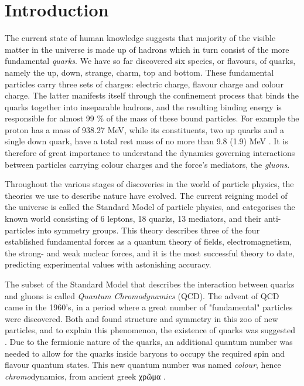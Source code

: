 \chapter{Introduction}

The current state of human knowledge suggests that majority of the visible
matter in the universe is made up of hadrons which in turn consist of
the more fundamental \emph{quarks}. We have so far discovered six species, or
flavours, of quarks, namely the up, down, strange, charm, top and bottom. These
fundamental particles carry three sets of charges: electric charge, flavour
charge and colour charge. The latter manifests itself
through the confinement process that binds the quarks together into inseparable
hadrons, and the resulting binding energy is responsible for almost 99 \% of the
mass of these bound particles. For example the proton has a mass of 938.27 MeV,
while its constituents, two up quarks and a single down quark, have a total rest
mass of no more than 9.8 (1.9) MeV \citep{Agashe:2014kda}. It is therefore of
great importance to understand the dynamics governing interactions between
particles carrying colour charges and the force's mediators, the \emph{gluons}. 

Throughout the various stages of discoveries in the world of particle physics,
the theories we use to describe nature have evolved. The current reigning model
of the universe is called the Standard Model of particle physics, and
categorises the known world consisting of 6 leptons, 18 quarks, 13 mediators,
and their anti-particles into symmetry groups. This theory describes three of
the four established fundamental forces as a quantum theory of fields,
electromagnetism, the strong- and weak nuclear forces, and it is
the most successful theory to date, predicting experimental values with
astonishing accuracy.

The subset of the Standard Model that describes the interaction between quarks
and gluons is called \emph{Quantum Chromodynamics} (QCD). The advent of QCD came
in the 1960's, in a period where a great number of "fundamental" particles were 
discovered. Both \cite{GellMann:1962xb} and \cite{Ne'eman:1961cd} found
structure and symmetry in this zoo of new particles, and to explain this
phenomenon, the existence of quarks was suggested \citep{GellMann:1964nj}.
Due to the fermionic nature of the quarks, an additional quantum number was
needed to allow for the quarks inside baryons to occupy the required spin
and flavour quantum states. This new quantum number was named \emph{colour},
hence \emph{chromo}dynamics, from ancient greek χρῶμα \citep{Greenberg:1964pe}.

